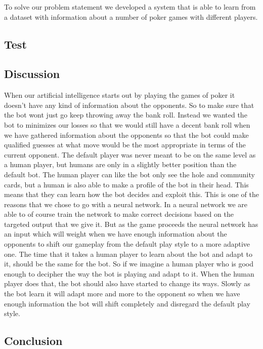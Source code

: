 To solve our problem statement we developed a system that is able to learn from a dataset with information about a number of poker games with different players.


\subsection{Test}
\subsection{Discussion}
When our artificial intelligence starts out by playing the games of poker it doesn't have any kind of information about the opponents. So to make sure that the bot wont just go keep throwing away the bank roll. Instead we wanted the bot to minimizes our losses so that we would still have a decent bank roll when we have gathered information about the opponents so that the bot could make qualified guesses at what move would be the most appropriate in terms of the current opponent. The default player was never meant to be on the same level as a human player, but humans are only in a slightly better position than the default bot. The human player can like the bot only see the hole and community cards, but a human is also able to make a profile of the bot in their head. This means that they can learn how the bot decides and exploit this. 
This is one of the reasons that we chose to go with a neural network. In a neural network we are able to of course train the network to make correct decisions based on the targeted output that we give it.
But as the game proceeds the neural network has an input which will weight when we have enough information about the opponents to shift our gameplay from the default play style to a more adaptive one.
The time that it takes a human player to learn about the bot and adapt to it, should be the same for the bot. So if we imagine a human player who is good enough to decipher the way the bot is playing and adapt to it. When the human player does that, the bot should also have started to change its ways. Slowly as the bot learn it will adapt more and more to the opponent so when we have enough information the bot will shift completely and disregard the default play style.
\subsection{Conclusion}